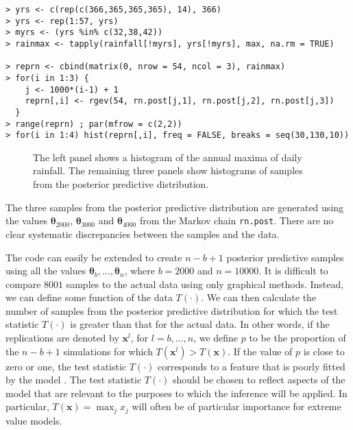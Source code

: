 \documentclass[11pt,a4paper]{article}
\newcommand{\bs}{\boldsymbol}
\begin{document}
\begin{verbatim}
> yrs <- c(rep(c(366,365,365,365), 14), 366) 
> yrs <- rep(1:57, yrs) 
> myrs <- (yrs %in% c(32,38,42))
> rainmax <- tapply(rainfall[!myrs], yrs[!myrs], max, na.rm = TRUE)
 
> reprn <- cbind(matrix(0, nrow = 54, ncol = 3), rainmax)
> for(i in 1:3) {
    j <- 1000*(i-1) + 1 
    reprn[,i] <- rgev(54, rn.post[j,1], rn.post[j,2], rn.post[j,3])
  }
> range(reprn) ; par(mfrow = c(2,2))
> for(i in 1:4) hist(reprn[,i], freq = FALSE, breaks = seq(30,130,10))
\end{verbatim}

\begin{figure}
\begin{center}
\vspace{-1.5cm}
\hspace{-0.5cm}
\hspace{-0.5cm}
\hspace{-0.5cm}
\end{center}
\caption{The left panel shows a histogram of the annual maxima of daily rainfall. The remaining three panels show histograms of samples from the posterior predictive distribution.}
\label{diagrain}
\end{figure}

The three samples from the posterior predictive distribution are generated using the values $\bs{\theta}_{2000}$, $\bs{\theta}_{3000}$ and $\bs{\theta}_{4000}$ from the Markov chain \verb+rn.post+.
There are no clear systematic discrepancies between the samples and the data.

The code can easily be extended to create $n-b+1$ posterior predictive samples using all the values $\bs{\theta}_b, \dots, \bs{\theta}_n$, where $b=2000$ and $n=10000$.
It is difficult to compare $8001$ samples to the actual data using only graphical methods.
Instead, we can define some function of the data $T(\cdot)$.
We can then calculate the number of samples from the posterior predictive distribution for which the test statistic $T(\cdot)$ is greater than that for the actual data.
In other words, if the replications are denoted by $\bs{x}^l$, for $l=b,\dots,n$, we define $p$ to be the proportion of the $n-b+1$ simulations for which  $T(\bs{x}^l) > T(\bs{x})$.
If the value of $p$ is close to zero or one, the test statistic $T(\cdot)$ corresponds to a feature that is poorly fitted by the model \citep{gelmcarl95}.
The test statistic $T(\cdot)$ should be chosen to reflect aspects of the model that are relevant to the purposes to which the inference will be applied.
In particular, $T(\bs{x}) = \max_j x_j$ will often be of particular importance for extreme value models.
\end{document}
